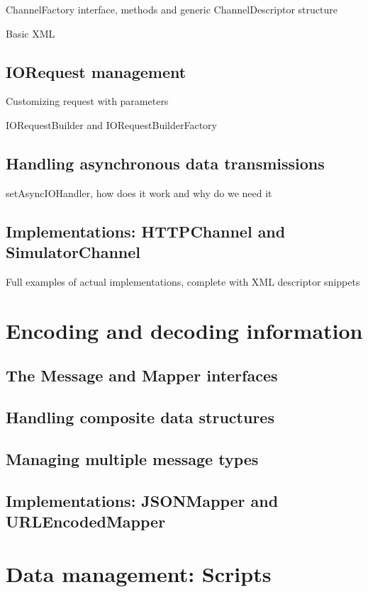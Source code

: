ChannelFactory interface, methods and generic ChannelDescriptor structure

Basic XML 

\subsection{IORequest management}

Customizing request with parameters

IORequestBuilder and IORequestBuilderFactory

\subsection{Handling asynchronous data transmissions}

setAsyncIOHandler, how does it work and why do we need it

\subsection{Implementations: HTTPChannel and SimulatorChannel}

Full examples of actual implementations, complete with XML descriptor snippets


\section{Encoding and decoding information}

\subsection{The Message and Mapper interfaces}

\subsection{Handling composite data structures}

\subsection{Managing multiple message types}

\subsection{Implementations: JSONMapper and URLEncodedMapper}


\section{Data management: Scripts}

